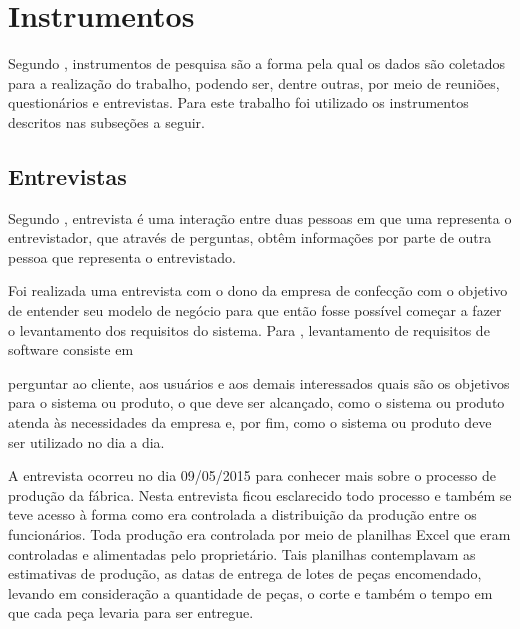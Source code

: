 \section{Instrumentos}

\par Segundo , instrumentos de pesquisa são a
forma pela qual os dados são coletados para a realização do trabalho, podendo ser,
dentre outras, por meio de reuniões, questionários e entrevistas. Para
este trabalho foi utilizado os instrumentos descritos nas subseções a seguir.

\subsection{Entrevistas}
\par Segundo , entrevista é
uma interação entre duas pessoas em que uma representa o entrevistador, 
que através de perguntas, obtêm informações por parte de outra pessoa que
representa o entrevistado.





\par Foi realizada uma entrevista com o dono da empresa de confecção com o
objetivo de entender seu modelo de negócio para que então fosse possível começar
a fazer o levantamento dos requisitos do sistema. Para
, levantamento de requisitos de
software consiste em

\begin{citacao}
perguntar ao cliente, aos usuários e aos demais interessados quais são os
objetivos para o sistema ou produto, o que deve ser alcançado, como o sistema ou
produto atenda às necessidades da empresa e, por fim, como o sistema ou produto
deve ser utilizado no dia a dia.
\end{citacao} 

\par A entrevista ocorreu no dia 09/05/2015 para conhecer mais sobre o processo de 
produção da fábrica. Nesta entrevista ficou esclarecido todo processo e também se teve 
acesso à forma como era controlada a distribuição da produção entre os funcionários. Toda
produção era controlada por meio de planilhas Excel que eram
controladas e alimentadas pelo proprietário. Tais planilhas contemplavam as
estimativas de produção, as datas de entrega de lotes de peças encomendado,
levando em consideração a quantidade de peças, o corte e também o tempo em que cada peça levaria
para ser entregue.


